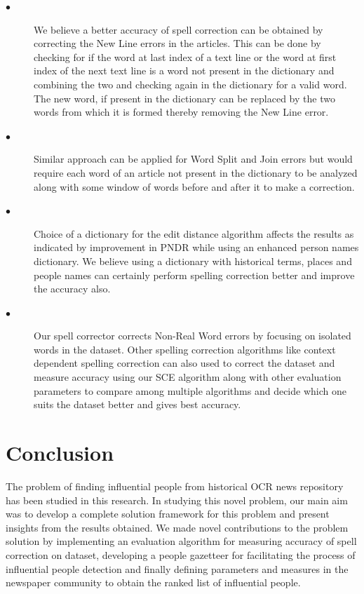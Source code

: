 \documentclass[letterpaper,11pt]{report}
\begin{document}
\begin{description}
\item[$\bullet$]\noindent
We believe a better accuracy of spell correction can be obtained by correcting the New Line errors in the articles. This can be done by checking for if the word at last index of a text line or the word at first index of the next text line is a word not present in the dictionary and combining the two and checking again in the dictionary for a valid word. The new word, if present in the dictionary can be replaced by the two words from which it is formed thereby removing the New Line error. 
\item[$\bullet$]\noindent Similar approach can be applied for Word Split and Join errors but would require each word of an article not present in the dictionary to be analyzed along with some window of words before and after it to make a correction. 
\item[$\bullet$]\noindent Choice of a dictionary for the edit distance algorithm affects the results as indicated by improvement in PNDR while using an enhanced person names dictionary. We believe using a dictionary with historical terms, places and people names can certainly perform spelling correction better and improve the accuracy also.
\item[$\bullet$] \noindent 
Our spell corrector corrects Non-Real Word errors by focusing on isolated words in the dataset. Other spelling correction algorithms like context dependent spelling correction can also used to correct the dataset and measure accuracy using our SCE algorithm along with other evaluation parameters to compare among multiple algorithms and decide which one suits the dataset better and gives best accuracy. 
\end{description}



 

 




\chapter{Conclusion}
\label{chapter:conclusion}

The problem of finding influential people from historical OCR news repository has been studied in this research. In studying this novel problem, our main aim was to develop a complete solution framework for this problem and present insights from the results obtained.
 We made novel contributions to the problem solution by implementing an evaluation algorithm for measuring accuracy of spell correction on dataset, developing a people gazetteer for facilitating the process of influential people detection and finally defining parameters and measures in the newspaper community to obtain the ranked list of influential people.
  
\end{document}
